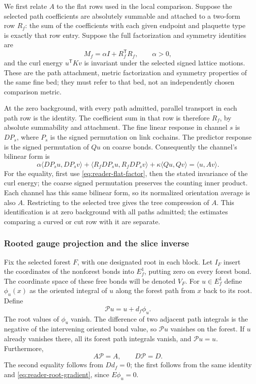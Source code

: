We first relate $A$ to the flat rows used in the local comparison.
Suppose the selected path coefficients are absolutely summable and
attached to a two-form row $R_f$: the sum of the coefficients with
each given endpoint and plaquette type is exactly that row entry.
Suppose the full factorization and symmetry identities are
\begin{equation}\label{eq:reader-flat-factor}
 M_f=\alpha I+R_f^{\mathsf T}R_f,\qquad \alpha>0,
\end{equation}
and the curl energy $u^{\mathsf T}Kv$ is invariant under the selected
signed lattice motions. These are the path attachment, metric
factorization and symmetry properties of the same fine bed; they
must refer to that bed, not an independently chosen comparison metric.

At the zero background, with every path admitted, parallel transport
in each path row is the identity. The coefficient sum in that row is
therefore $R_f$, by absolute summability and attachment. The fine
linear response in channel $s$ is $DP_s$, where $P_s$ is the signed
permutation on link cochains. The predictor response is the signed
permutation of $Qu$ on coarse bonds. Consequently the channel's
bilinear form is
\[
 \alpha\langle DP_su,DP_sv\rangle
 +\langle R_fDP_su,R_fDP_sv\rangle
 +\kappa\langle Qu,Qv\rangle
 =\langle u,Av\rangle.
\]
For the equality, first use \eqref{eq:reader-flat-factor}, then the
stated invariance of the curl energy; the coarse signed permutation
preserves the counting inner product. Each channel has this same
bilinear form, so its normalized orientation average is also $A$.
Restricting to the selected tree gives the tree compression of $A$.
This identification is at zero background with all paths admitted;
the estimates comparing a curved or cut row with it are separate.

\subsubsection{Rooted gauge projection and the slice inverse}

Fix the selected forest $F$, with one designated root in each block.
Let $I_F$ insert the coordinates of the nonforest bonds into $E_f^1$,
putting zero on every forest bond. The coordinate space of these
free bonds will be denoted $V_F$. For $u\in E_f^1$ define $\phi_u(x)$
as the oriented integral of $u$ along the forest path from $x$ back
to its root. Define
\[
 \mathcal Pu=u+d_f\phi_u.
\]
The root values of $\phi_u$ vanish. The difference of two adjacent
path integrals is the negative of the intervening oriented bond
value, so $\mathcal Pu$ vanishes on the forest. If $u$ already
vanishes there, all its forest path integrals vanish, and
$\mathcal Pu=u$. Furthermore,
\begin{equation}\label{eq:reader-slice-projection}
 A\mathcal P=A,\qquad D\mathcal P=D.
\end{equation}
The second equality follows from $Dd_f=0$; the first follows from
the same identity and \eqref{eq:reader-root-gradient}, since
$E\phi_u=0$.

